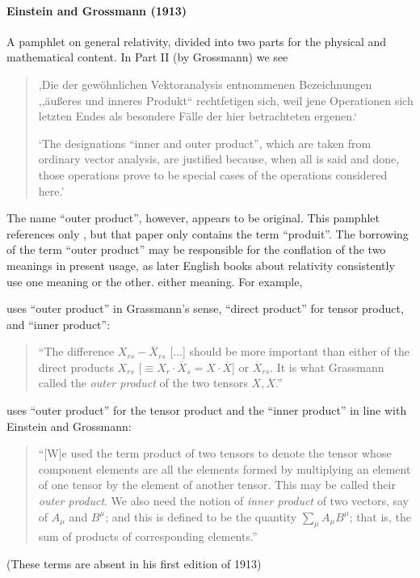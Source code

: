 \paragraph{Einstein and Grossmann (1913)}

A pamphlet on general relativity, divided into two parts for the physical and mathematical content. In Part II (by Grossmann) we see

\begin{quote}

,Die der gewöhnlichen Vektoranalysis entnommenen Bezeichnungen ,,äußeres und inneres Produkt`` rechtfetigen sich, weil jene Operationen sich letzten Endes als besondere Fälle der hier betrachteten ergenen.`~\cite[p. 26]{Einstein1913}\cite[p. 327]{Einstein1995}

`The designations ``inner and outer product'', which are taken from ordinary vector analysis, are justified because, when all is said and done, those operations prove to be special cases of the operations considered here.'~\cite[p. 175]{Einstein1996}
\end{quote}
The name ``outer product'', however, appears to be original. This pamphlet references only \cite{Ricci1900}, but that paper only contains the term ``produit''.
The borrowing of the term ``outer product'' may be responsible for the conflation of the two meanings in present usage, as later English books about relativity consistently use one meaning or the other. either meaning. For example,

\cite[p. 25]{Murnaghan1922} uses ``outer product'' in Grassmann's sense, ``direct product'' for tensor product, and ``inner product'':
\begin{quote}
``The difference $X_{rs} - \overline X_{rs}$ [...] should be more important than either of the direct products $X_{rs}$ [$\equiv X_r \cdot \overline X_s = X \cdot \overline X$] or $\overline X_{rs}$. It is what Grassmann called the \textit{outer product} of the two tensors $X, \overline X$.''
\end{quote}

\cite[p. 87]{Carmichael1920} uses ``outer product'' for the tensor product and the ``inner product'' in line with Einstein and Grossmann:
\begin{quote}
``[W]e used the term product of two tensors to denote the tensor whose component elements are all the elements formed by multiplying an element of one tensor by the element of another tensor. This may be called their \textit{outer product}. We also need the notion of \textit{inner product} of two vectors, say of $A_\mu$ and $B^\mu$; and this is defined to be the quantity $\sum_\mu A_\mu B^\mu$; that is, the sum of products of corresponding elements.''
\end{quote}
(These terms are absent in his first edition of 1913)

